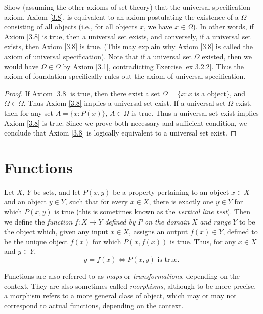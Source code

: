 \begin{exercise}\label{ex 3.2.3}
Show (assuming the other axioms of set theory) that the universal specification axiom, Axiom \ref{3.8}, is equivalent to an axiom postulating the existence of a  \(\Omega\) consisting of all objects (i.e., for all objects \(x\), we have \(x \in \Omega\)).
In other words, if Axiom \ref{3.8} is true, then a universal set exists, and conversely, if a universal set exists, then Axiom \ref{3.8} is true.
(This may explain why Axiom \ref{3.8} is called the axiom of universal specification).
Note that if a universal set \(\Omega\) existed, then we would have \(\Omega \in \Omega\) by Axiom \ref{3.1}, contradicting Exercise \ref{ex 3.2.2}.
Thus the axiom of foundation specifically rules out the axiom of universal specification.
\end{exercise}

\begin{proof}
If Axiom \ref{3.8} is true, then there exist a set \(\Omega = \{x: x \text{ is a object}\}\), and \(\Omega \in \Omega\).
Thus Axiom \ref{3.8} implies a universal set exist.
If a universal set \(\Omega\) exist, then for any set \(A = \{x: P(x)\}\), \(A \in \Omega\) is true.
Thus a universal set exist implies Axiom \ref{3.8} is true.
Since we prove both necessary and sufficient condition, we conclude that Axiom \ref{3.8} is logically equivalent to a universal set exist.
\end{proof}

\section{Functions}

\begin{definition}[Functions]\label{3.3.1}
Let \(X\), \(Y\) be sets, and let \(P(x, y)\) be a property pertaining to an object \(x \in X\) and an object \(y \in Y\), such that for every \(x \in X\), there is exactly one \(y \in Y\) for which \(P(x, y)\) is true (this is sometimes known as the \emph{vertical line test}).
Then we define the \emph{function} \(f : X \to Y\) \emph{defined by} \(P\) \emph{on the domain} \(X\) \emph{and range} \(Y\) to be the object which, given any input \(x \in X\), assigns an output \(f(x) \in Y\), defined to be the unique object \(f(x)\) for which \(P(x, f(x))\) is true.
Thus, for any \(x \in X\) and \(y \in Y\),
\[
    y = f(x) \iff P(x, y) \text{ is true}.
\]
\end{definition}

Functions are also referred to as \emph{maps} or \emph{transformations}, depending on the context.
They are also sometimes called \emph{morphisms}, although to be more precise, a morphism refers to a more general class of object, which may or may not correspond to actual functions, depending on the context.


